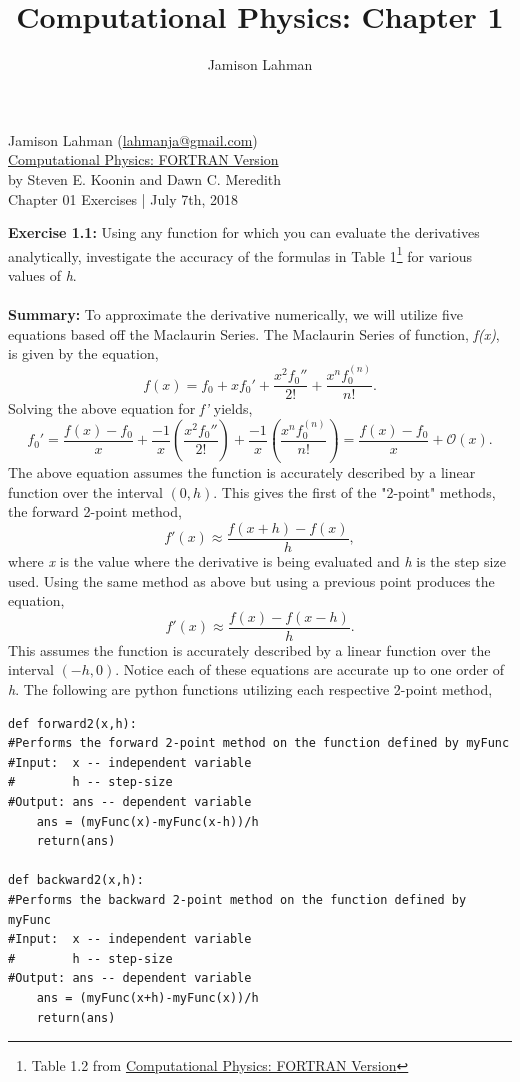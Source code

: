 \documentclass[10pt]{article}
\author{Jamison Lahman}
\title{Computational Physics: Chapter 1}
\begin{document}
\begin{flushright}Jamison Lahman (\href{mailto:lahmanja@gmail.com}{lahmanja@gmail.com}) \\
\href{https://www.amazon.com/Computational-Physics-Fortran-Steven-Koonin/dp/0201386232}{Computational Physics: FORTRAN Version} \\
by Steven E. Koonin and Dawn C. Meredith\\
Chapter 01 Exercises | July 7th, 2018 \\
\end{flushright}
\textbf{Exercise 1.1:} Using any function for which you can evaluate the derivatives analytically, investigate the accuracy of the formulas in Table 1\footnote{Table 1.2 from \href{https://www.amazon.com/Computational-Physics-Fortran-Steven-Koonin/dp/0201386232}{Computational Physics: FORTRAN Version}} for various values of \textit{h}. \\
\\
\textbf{Summary:} To approximate the derivative numerically, we will utilize five equations based off the Maclaurin Series. The Maclaurin Series of function, \textit{f(x)}, is given by the equation,
\begin{equation}
f(x) = f_0 +x f_0'+ \frac{x^2f_0''}{2!} + \frac{x^nf_0^(n)}{n!}.
\end{equation}
Solving the above equation for \textit{f'} yields,
\begin{equation}
f_0' = \frac{f(x)-f_0}{x}+\frac{-1}{x}\left(\frac{x^2f_0''}{2!} \right)+ \frac{-1}{x} \left(\frac{x^nf_0^{(n)}}{n!}\right) =  \frac{f(x)-f_0}{x}  + \mathcal{O}(x).
\end{equation}
The above equation assumes the function is accurately described by a linear function over the interval $(0,h)$. This gives the first of the "2-point" methods, the forward 2-point method,
\begin{equation}
\label{eq:forward2}
f'(x) \approx \frac{f(x+h)-f(x)}{h},
\end{equation}
where \textit{x} is the value where the derivative is being evaluated and \textit{h} is the step size used. Using the same method as above but using a previous point produces the equation,
\begin{equation}
\label{eq:backward2}
f'(x) \approx \frac{f(x)-f(x-h)}{h}.
\end{equation}
This assumes the function is accurately described by a linear function over the interval $(-h,0)$. Notice each of these equations are accurate up to one order of \textit{h}. The following are python functions utilizing each respective 2-point method,
\begin{lstlisting}
def forward2(x,h):
#Performs the forward 2-point method on the function defined by myFunc
#Input:  x -- independent variable
#        h -- step-size
#Output: ans -- dependent variable
    ans = (myFunc(x)-myFunc(x-h))/h
    return(ans)

def backward2(x,h):
#Performs the backward 2-point method on the function defined by myFunc
#Input:  x -- independent variable
#        h -- step-size
#Output: ans -- dependent variable
    ans = (myFunc(x+h)-myFunc(x))/h
    return(ans)
\end{lstlisting}
    
\end{document}
